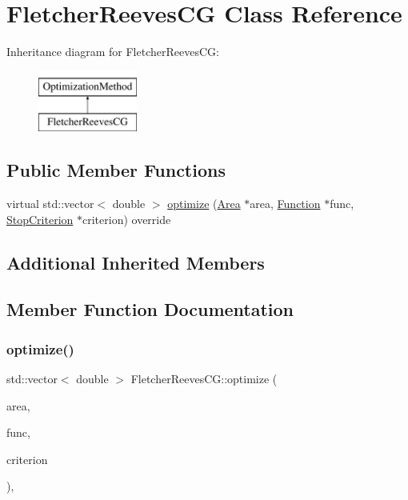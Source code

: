 \hypertarget{class_fletcher_reeves_c_g}{}\section{Fletcher\+Reeves\+CG Class Reference}
\label{class_fletcher_reeves_c_g}
Inheritance diagram for Fletcher\+Reeves\+CG\+:\begin{figure}[H]
\begin{center}
\leavevmode
\includegraphics[height=2.000000cm]{class_fletcher_reeves_c_g}
\end{center}
\end{figure}
\subsection*{Public Member Functions}
\begin{DoxyCompactItemize}
\item 
virtual std\+::vector$<$ double $>$ \mbox{\hyperlink{class_fletcher_reeves_c_g_a40c56c0485371b31000672236b433dc7}{optimize}} (\mbox{\hyperlink{class_area}{Area}} $\ast$area, \mbox{\hyperlink{class_function}{Function}} $\ast$func, \mbox{\hyperlink{class_stop_criterion}{Stop\+Criterion}} $\ast$criterion) override
\end{DoxyCompactItemize}
\subsection*{Additional Inherited Members}


\subsection{Member Function Documentation}
\mbox{\label{class_fletcher_reeves_c_g_a40c56c0485371b31000672236b433dc7}} 
\subsubsection{\texorpdfstring{optimize()}{optimize()}}
{\footnotesize\ttfamily std\+::vector$<$ double $>$ Fletcher\+Reeves\+C\+G\+::optimize (\begin{DoxyParamCaption}\item[{\mbox{\hyperlink{class_area}{Area}} $\ast$}]{area,  }\item[{\mbox{\hyperlink{class_function}{Function}} $\ast$}]{func,  }\item[{\mbox{\hyperlink{class_stop_criterion}{Stop\+Criterion}} $\ast$}]{criterion }\end{DoxyParamCaption})\hspace{0.3cm}{\ttfamily [override]}, {\ttfamily [virtual]}}

